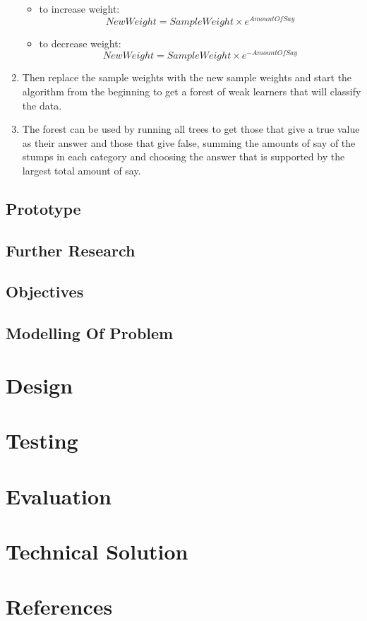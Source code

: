 \documentclass{article}
\begin{document}
\begin{enumerate}
    \begin{itemize}
        \item to increase weight: $$NewWeight = SampleWeight \times e^{AmountOfSay}$$
        \item to decrease weight: $$New Weight = SampleWeight \times e^{-AmountOfSay}$$
    \end{itemize}
    \item Then replace the sample weights with the new sample weights and start the algorithm from the beginning to get a forest of weak learners that will classify the data.
    \item The forest can be used by running all trees to get those that give a true value as their answer and those that give false, summing the amounts of say of the stumps in each category and choosing the answer that is supported by the largest total amount of say.
\end{enumerate}
\newpage
\subsection{Prototype}


\subsection{Further Research}


\subsection{Objectives}


\subsection{Modelling Of Problem}


\section{\textbf{Design}}


\section{\textbf{Testing}}


\section{\textbf{Evaluation}}


\section{\textbf{Technical Solution}}

\section{\textbf{References}}

\end{document}
